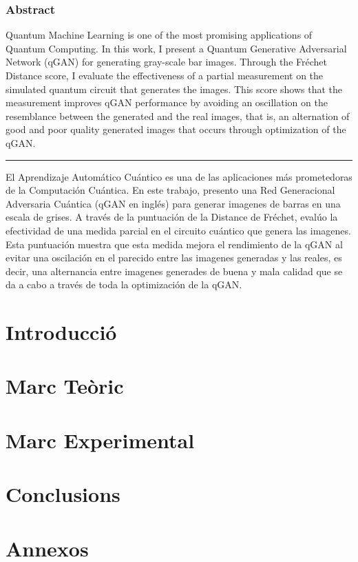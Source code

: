 \documentclass[a4paper,12pt,arial,numbered,print,oneside]{book}
\newcommand\blankpage{%
	\null
	\thispagestyle{empty}%
	\addtocounter{page}{-1}%
	\newpage}
\begin{document}
	\afterpage{\blankpage}

	\tableofcontents
	
	\afterpage{\blankpage}
	
	\section*{Abstract}
	\tab Quantum Machine Learning is one of the most promising applications of Quantum Computing. In this work, I present a Quantum Generative Adversarial Network (qGAN) for generating gray-scale bar images. Through the Fréchet Distance score, I evaluate the effectiveness of a partial measurement on the simulated quantum circuit that generates the images. This score shows that the measurement improves qGAN performance by avoiding an oscillation on the resemblance between the generated and the real images, that is, an alternation of good and poor quality generated images that occurs through optimization of the qGAN. 
	
	\vspace{1cm}
	\hrule
	\vspace{1cm}

	El Aprendizaje Automático Cuántico es una de las aplicaciones más prometedoras de la Computación Cuántica. En este trabajo, presento una Red Generacional Adversaria Cuántica (qGAN en inglés) para generar imagenes de barras en una escala de grises. A través de la puntuación de la Distance de Fréchet, evalúo la efectividad de una medida parcial en el circuito cuántico que genera las imagenes. Esta puntuación muestra que esta medida mejora el rendimiento de la qGAN al evitar una oscilación en el parecido entre las imagenes generadas y las reales, es decir, una alternancia entre imagenes generades de buena y mala calidad que se da a cabo a través de toda la optimización de la qGAN.
	
	\clearpage
	
	
	\afterpage{\blankpage}
	
	\part{Introducció}
	\label{part:intro}
	
	
	\part{Marc Teòric}
	\label{part:theoretical_framework}
	
	
	\part{Marc Experimental}
	\label{part:experimental_work}
	
	
	\part{Conclusions}
	\label{part:conclusions}
	

	\setcounter{chapter}{0}
	\renewcommand{\thechapter}{\Alph{chapter}}
	\part{Annexos}
	\label{part:appendices}
	

	\typeout{}
	
	
	
\end{document}
